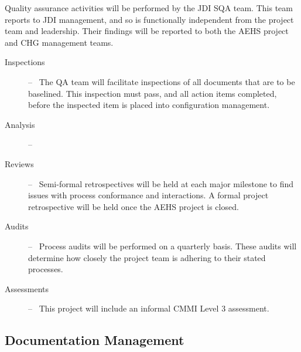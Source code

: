 \documentclass[11pt]{article}
\begin{document}
Quality assurance activities will be performed by the JDI SQA team.  This team reports to JDI
management, and so is functionally independent from the project team and leadership.  Their findings
will be reported to both the AEHS project and CHG management teams.

\begin{description}
\item[Inspections] --~ The QA team will facilitate inspections of all documents that are to be
  baselined.  This inspection must pass, and all action items completed, before the inspected item
  is placed into configuration management.
\item[Analysis] --~ 
\item[Reviews] --~ Semi-formal retrospectives will be held at each major milestone to find issues
  with process conformance and interactions.  A formal project retrospective will be held once the
  AEHS project is closed.
\item[Audits] --~ Process audits will be performed on a quarterly basis.  These audits will
  determine how closely the project team is adhering to their stated processes.
\item[Assessments] --~ This project will include an informal CMMI Level 3 assessment.
\end{description}


\subsection{Documentation Management}
\end{document}
